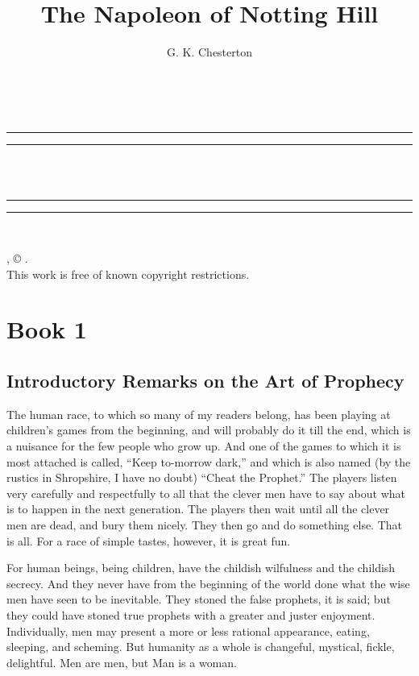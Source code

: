 \documentclass{book}
\date{}
\title{The Napoleon of Notting Hill}
\author{G. K. Chesterton}
\makeatletter
\renewcommand{\maketitle}{
  \thispagestyle{empty}
  \vspace*{\stretch{1}}
  
  \begin{center}
    {\Huge \@title   \\[5mm]}
  \end{center}
  \vspace*{\stretch{2}}
  
  \newpage
  \thispagestyle{empty}
  \cleardoublepage

  \begin{center}  
    \thispagestyle{empty}
    \vspace*{\baselineskip}
    \rule{\textwidth}{1.6pt}\vspace*{-\baselineskip}\vspace*{2pt}
    \rule{\textwidth}{0.4pt}\\[\baselineskip]
    
    {\Huge\scshape \@title   \\[5mm]}
    {\Large }
    
    \rule{\textwidth}{0.4pt}\vspace*{-\baselineskip}\vspace{3.2pt}
    \rule{\textwidth}{1.6pt}\\[\baselineskip]

    \vspace*{4\baselineskip}

    {\Large \@author}
    \vfill
    
  \end{center}
  
  \pagebreak
  \newpage
  \thispagestyle{empty}
  \null\vfill
  \noindent
  \begin{center}
    {\emph{\@title}, © \@author.\\[5mm]}
    {This work is free of known copyright restrictions.\\[5mm]}
  \end{center}
  \pagebreak
  \newpage
}
\makeatother
\begin{document}

\renewcommand{\partname}{Book}


\maketitle

\setcounter{tocdepth}{0}
\setcounter{secnumdepth}{0}
\tableofcontents
\setcounter{chapter}{0}\part*{Book 1}
\label{chapter-0}
\chapter{Introductory Remarks on the Art of Prophecy}
\label{chapter-1}
The human race, to which so many of my readers belong, has been playing at children’s games from the beginning, and will probably do it till the end, which is a nuisance for the few people who grow up. And one of the games to which it is most attached is called, “Keep to-morrow dark,” and which is also named (by the rustics in Shropshire, I have no doubt) “Cheat the Prophet.” The players listen very carefully and respectfully to all that the clever men have to say about what is to happen in the next generation. The players then wait until all the clever men are dead, and bury them nicely. They then go and do something else. That is all. For a race of simple tastes, however, it is great fun.

For human beings, being children, have the childish wilfulness and the childish secrecy. And they never have from the beginning of the world done what the wise men have seen to be inevitable. They stoned the false prophets, it is said; but they could have stoned true prophets with a greater and juster enjoyment. Individually, men may present a more or less rational appearance, eating, sleeping, and scheming. But humanity as a whole is changeful, mystical, fickle, delightful. Men are men, but Man is a woman.
\end{document}
